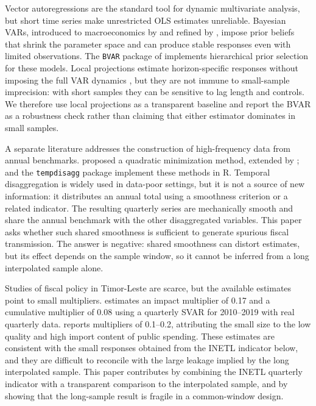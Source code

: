 \documentclass[11pt,a4paper]{article}
\begin{document}
Vector autoregressions are the standard tool for dynamic multivariate analysis, but short time series make unrestricted OLS estimates unreliable. Bayesian VARs, introduced to macroeconomics by \textcite{litterman1986} and refined by \textcite{giannone2015}, impose prior beliefs that shrink the parameter space and can produce stable responses even with limited observations. The \texttt{BVAR} package of \textcite{bvar2021} implements hierarchical prior selection for these models. Local projections estimate horizon-specific responses without imposing the full VAR dynamics \parencite{jorda2005}, but they are not immune to small-sample imprecision: with short samples they can be sensitive to lag length and controls. We therefore use local projections as a transparent baseline and report the BVAR as a robustness check rather than claiming that either estimator dominates in small samples.

A separate literature addresses the construction of high-frequency data from annual benchmarks. \textcite{denton1971} proposed a quadratic minimization method, extended by \textcite{cholette1984}; \textcite{saxsteiner2013} and the \texttt{tempdisagg} package implement these methods in R. Temporal disaggregation is widely used in data-poor settings, but it is not a source of new information: it distributes an annual total using a smoothness criterion or a related indicator. The resulting quarterly series are mechanically smooth and share the annual benchmark with the other disaggregated variables. This paper asks whether such shared smoothness is sufficient to generate spurious fiscal transmission. The answer is negative: shared smoothness can distort estimates, but its effect depends on the sample window, so it cannot be inferred from a long interpolated sample alone.

Studies of fiscal policy in Timor-Leste are scarce, but the available estimates point to small multipliers. \textcite{worldbank2021} estimates an impact multiplier of 0.17 and a cumulative multiplier of 0.08 using a quarterly SVAR for 2010--2019 with real quarterly data. \textcite{imf2024} reports multipliers of 0.1--0.2, attributing the small size to the low quality and high import content of public spending. These estimates are consistent with the small responses obtained from the INETL indicator below, and they are difficult to reconcile with the large leakage implied by the long interpolated sample. This paper contributes by combining the INETL quarterly indicator with a transparent comparison to the interpolated sample, and by showing that the long-sample result is fragile in a common-window design.
\end{document}
